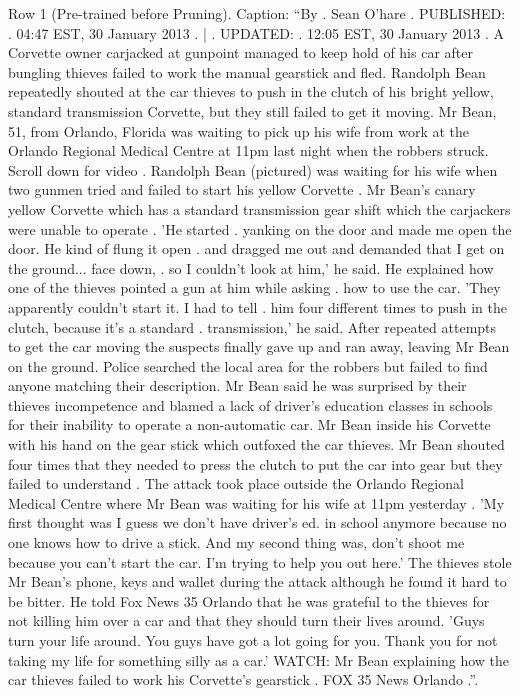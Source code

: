 \begin{table}[H]
\centering
\caption{Row 1 (Pre-trained before Pruning). \ifshowcaption{}Caption: ``By . Sean O'hare . PUBLISHED: . 04:47 EST, 30 January 2013 . | . UPDATED: . 12:05 EST, 30 January 2013 . A Corvette owner carjacked at gunpoint managed to keep hold of his car after bungling thieves failed to work the manual gearstick and fled. Randolph Bean repeatedly shouted at the car thieves to push in the clutch of his bright yellow, standard transmission Corvette, but they still failed to get it moving. Mr Bean, 51, from Orlando, Florida was waiting to pick up his wife from work at the Orlando Regional Medical Centre at 11pm last night when the robbers struck. Scroll down for video . Randolph Bean (pictured) was waiting for his wife when two gunmen tried and failed to start his yellow Corvette . Mr Bean's canary yellow Corvette which has a standard transmission gear shift which the carjackers were unable to operate . 'He started . yanking on the door and made me open the door. He kind of flung it open . and dragged me out and demanded that I get on the ground... face down, . so I couldn't look at him,' he said. He explained how one of the thieves pointed a gun at him while asking . how to use the car. 'They apparently couldn't start it. I had to tell . him four different times to push in the clutch, because it's a standard . transmission,' he said. After repeated attempts to get the car moving the suspects finally gave up and ran away, leaving Mr Bean on the ground. Police searched the local area for the robbers but failed to find anyone matching their description. Mr Bean said he was surprised by their thieves incompetence and blamed a lack of driver's education classes in schools for their inability to operate a non-automatic car. Mr Bean inside his Corvette with his hand on the gear stick which outfoxed the car thieves. Mr Bean shouted four times that they needed to press the clutch to put the car into gear but they failed to understand . The attack took place outside the Orlando Regional Medical Centre where Mr Bean was waiting for his wife at 11pm yesterday . 'My first thought was I guess we don't have driver's ed. in school anymore because no one knows how to drive a stick. And my second thing was, don't shoot me because you can't start the car. I'm trying to help you out here.' The thieves stole Mr Bean's phone, keys and wallet during the attack although he found it hard to be bitter. He told Fox News 35 Orlando that he was grateful to the thieves for not killing him over a car and that they should turn their lives around. 'Guys turn your life around. You guys have got a lot going for you. Thank you for not taking my life for something silly as a car.' WATCH: Mr Bean explaining how the car thieves failed to work his Corvette's gearstick . FOX 35 News Orlando .''.\fi}

\end{table}
